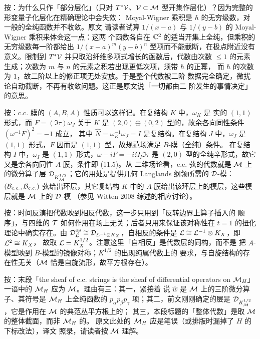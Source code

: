 \begin{yizhu}[含糊点拨]
按：为什么只作「部分层化」（只对 $T^*{\cal V}$、${\cal V}\subset\M$
型开集作层化）？因为完整的形变量子化层化在精确理论中会失效：
Moyal-Wigner 乘积是 $\hbar$ 的无穷级数，对一般的全纯函数并不收敛。原文
请读者试算 $1/(x-a)$ 与 $1/(y-b)$ 的 Moyal-Wigner 乘积来体会这一点：这两
个函数各自在 $\Bbb C^2$ 的适当开集上全纯，但乘积的无穷级数每一阶都给出
$1/(x-a)^m(y-b)^n$ 型项而不能截断，在极点附近没有意义。限制到
$T^*{\cal V}$ 并只取沿纤维多项式增长的函数后，代数由次数 $\le 1$ 的元素
生成；次数为 $m$ 与 $n$ 的元素之积若出现更低次项，须带 $\hbar$ 的正幂，
而 $\hbar$ 的次数为 $1$，故二阶以上的修正项无处安放。于是整个代数被二阶
数据完全确定，微扰论自动截断，不再有收敛问题。这正是原文说「一切都由二
阶发生的事情决定」的意思。
\end{yizhu}

\begin{yizhu}[物理图像]
按：c.c. 膜的 $(A,B,A)$ 性质可以这样记。在复结构 $K$ 中，$\omega_K$ 是
实的 $(1,1)$ 形式，而 $F=(\Im\tau)\omega_J$ 关于 $K$ 是
$(2,0)\oplus(0,2)$ 型的，故余各向同性条件 $(\omega^{-1}F)^2=-1$ 成立，
其中 $\hat N=\omega_K^{-1}\omega_J=I$ 是复结构。在复结构 $J$ 中，$\omega_J$
是 $(1,1)$ 形式，$F$ 因而是 $(1,1)$ 型，故规范场满足 $B$-膜（全纯）条件。
在复结构 $I$ 中，$\omega_I$ 是 $(1,1)$ 形式，$\omega-iF=-i\Omega_I\Im\tau$
是 $(2,0)$ 型的全纯辛形式，故它又是余各向同性 $A$-膜，条件即 (11.5)。从
二维场论看，c.c. 弦的代数就是 $\M$ 上的微分算子层
${\cal D}_{K_\M^{1/2}}$；它的用处是提供几何 Langlands 纲领所需的
${\cal D}$-模：$({\cal B}_{c.c.},{\cal B}_{c.c.})$ 弦给出环层，其它复结构
$K$ 中的 $A$-膜给出该环层上的模层，这些模层就是 $\M$ 上的 ${\cal D}$-模
（参见 Witten 2008 综述的相应讨论）。
\end{yizhu}

\begin{yizhu}[易错点]
按：时间反演把代数映到相反代数，这一步只用到「反转边界上算子插入的
顺序」，与四维的 $\EUT$ 如何作用在场上无关；后者只用来保证该对称性在
$t=1$ 的扭化理论中确实存在。由 ${\cal D}_{\cL}^{op}\cong
{\cal D}_{\cL^{-1}\otimes K_X}$，自相反的条件是
${\cal L}\cong{\cal L}^{-1}\otimes K_X$，即 ${\cal L}^2\cong K_X$，
故取 ${\cal L}=K_X^{1/2}$。注意这里「自相反」是代数层的同构，而不是
把 $A$-模型映到 $B$-模型的镜像对称；$K^{1/2}$ 的出现纯属代数上的
要求，与自旋结构的存在性无关（$\M$ 恰是自旋流形，故平方根存在）。
\end{yizhu}

\begin{yizhu}[原文疑误]
按：末段「the sheaf of c.c. strings is the sheaf of differential
operators on $\MH$」一语中的 $\MH$ 应为 $\M$。理由有三：其一，紧接着
说 $\hat w$ 是 $\M$ 上的三阶微分算子、其符号是 $\MH$ 上全纯函数的
$p_\alpha p_\beta p_\gamma$ 项；其二，前文刚刚确定的层是
${\cal D}_{K_{\EUM}^{1/2}}$，它是作用在 $\M$ 的典范丛平方根上的；
其三，本段标题的「整体代数」是取 $\M$ 的整体截面，而非 $\MH$ 的。
原文此处的 $\MH$ 应是笔误（或排版时漏掉了 $H$ 的下标改法），译文
照录，请读者按 $\M$ 理解。
\end{yizhu}

